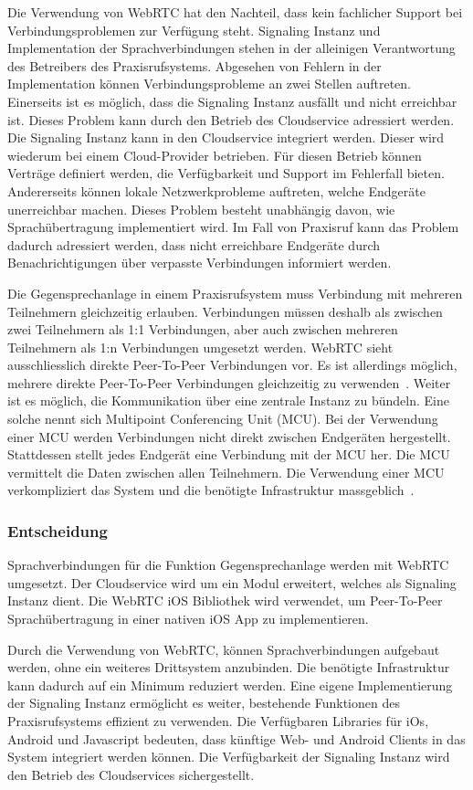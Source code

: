 Die Verwendung von WebRTC hat den Nachteil, dass kein fachlicher Support bei Verbindungsproblemen zur Verfügung steht.
Signaling Instanz und Implementation der Sprachverbindungen stehen in der alleinigen Verantwortung des Betreibers des Praxisrufsystems.
Abgesehen von Fehlern in der Implementation können Verbindungsprobleme an zwei Stellen auftreten.
Einerseits ist es möglich, dass die Signaling Instanz ausfällt und nicht erreichbar ist.
Dieses Problem kann durch den Betrieb des Cloudservice adressiert werden.
Die Signaling Instanz kann in den Cloudservice integriert werden.
Dieser wird wiederum bei einem Cloud-Provider betrieben.
Für diesen Betrieb können Verträge definiert werden, die Verfügbarkeit und Support im Fehlerfall bieten.
Andererseits können lokale Netzwerkprobleme auftreten, welche Endgeräte unerreichbar machen.
Dieses Problem besteht unabhängig davon, wie Sprachübertragung implementiert wird.
Im Fall von Praxisruf kann das Problem dadurch adressiert werden, dass nicht erreichbare Endgeräte durch Benachrichtigungen über verpasste Verbindungen informiert werden.

Die Gegensprechanlage in einem Praxisrufsystem muss Verbindung mit mehreren Teilnehmern gleichzeitig erlauben.
Verbindungen müssen deshalb als zwischen zwei Teilnehmern als 1:1 Verbindungen, aber auch zwischen mehreren Teilnehmern als 1:n Verbindungen umgesetzt werden.
WebRTC sieht ausschliesslich direkte Peer-To-Peer Verbindungen vor.
Es ist allerdings möglich, mehrere direkte Peer-To-Peer Verbindungen gleichzeitig zu verwenden~\cite{webrtc_mesh}.
Weiter ist es möglich, die Kommunikation über eine zentrale Instanz zu bündeln.
Eine solche nennt sich Multipoint Conferencing Unit (MCU).
Bei der Verwendung einer MCU werden Verbindungen nicht direkt zwischen Endgeräten hergestellt.
Stattdessen stellt jedes Endgerät eine Verbindung mit der MCU her.
Die MCU vermittelt die Daten zwischen allen Teilnehmern.
Die Verwendung einer MCU verkompliziert das System und die benötigte Infrastruktur massgeblich~\cite{webrtc_mcu}.

\subsubsection{Entscheidung}

Sprachverbindungen für die Funktion Gegensprechanlage werden mit WebRTC umgesetzt.
Der Cloudservice wird um ein Modul erweitert, welches als Signaling Instanz dient.
Die WebRTC iOS Bibliothek wird verwendet, um Peer-To-Peer Sprachübertragung in einer nativen iOS App zu implementieren.

Durch die Verwendung von WebRTC, können Sprachverbindungen aufgebaut werden, ohne ein weiteres Drittsystem anzubinden.
Die benötigte Infrastruktur kann dadurch auf ein Minimum reduziert werden.
Eine eigene Implementierung der Signaling Instanz ermöglicht es weiter, bestehende Funktionen des Praxisrufsystems effizient zu verwenden.
Die Verfügbaren Libraries für iOs, Android und Javascript bedeuten, dass künftige Web- und Android Clients in das System integriert werden können.
Die Verfügbarkeit der Signaling Instanz wird den Betrieb des Cloudservices sichergestellt.

\clearpage
